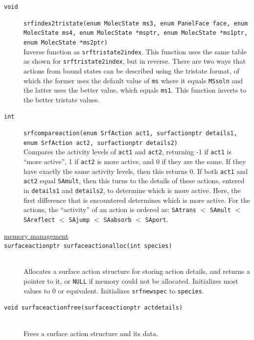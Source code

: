 \documentclass {scrbook}
\newcommand {\ttt} {\texttt}
\begin{document}
\begin{description}
\item[\ttt{void}]
\ttt{srfindex2tristate(enum MolecState ms3, enum PanelFace face, enum MolecState ms4, enum MolecState *msptr, enum MolecState *ms1ptr, enum MolecState *ms2ptr)}
\hfill \\
Inverse function as \ttt{srftristate2index}. This function uses the same table as shown for \ttt{srftristate2index}, but in reverse. There are two ways that actions from bound states can be described using the tristate format, of which the former uses the default value of \ttt{ms} where it equals \ttt{MSsoln} and the latter uses the better value, which equals \ttt{ms1}. This function inverts to the better tristate values.

\item[\ttt{int}]
\ttt{srfcompareaction(enum SrfAction act1, surfactionptr details1, enum SrfAction act2, surfactionptr details2)}
\hfill \\
Compares the activity levels of \ttt{act1} and \ttt{act2}, returning -1 if \ttt{act1} is ``more active'', 1 if \ttt{act2} is more active, and 0 if they are the same. If they have exactly the same activity levels, then this returns 0. If both \ttt{act1} and \ttt{act2} equal \ttt{SAmult}, then this turns to the details of these actions, entered in \ttt{details1} and \ttt{details2}, to determine which is more active. Here, the first difference that is encountered determines which is more active. For the actions, the ``activity'' of an action is ordered as: \ttt{SAtrans} $<$ \ttt{SAmult} $<$ \ttt{SAreflect} $<$ \ttt{SAjump} $<$ \ttt{SAabsorb} $<$ \ttt{SAport}.

\item[\underline{memory management}]

\item[\ttt{surfaceactionptr surfaceactionalloc(int species)}]
\hfill \\
Allocates a surface action structure for storing action details, and returns a pointer to it, or \ttt{NULL} if memory could not be allocated. Initializes most values to 0 or equivalent. Initializes \ttt{srfnewspec} to \ttt{species}.

\item[\ttt{void surfaceactionfree(surfaceactionptr actdetails)}]
\hfill \\
Frees a surface action structure and its data.


\end{description}
\end{document}
